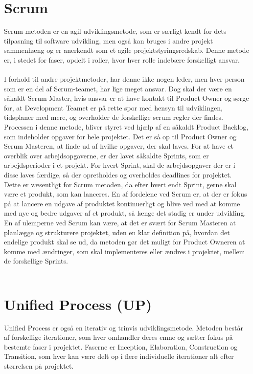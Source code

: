 \section{Scrum}
Scrum-metoden er en agil udviklingsmetode, som er særligt kendt for dets tilpasning til software udvikling, men også kan bruges i andre projekt sammenhæng og er anerkendt som et agile projektstyringsredskab. Denne metode er, i stedet for faser, opdelt i roller, hvor hver rolle indebære forskelligt ansvar.\cite{ScrumRoles} \\ \\
I forhold til andre projektmetoder, har denne ikke nogen leder, men hver person som er en del af Scrum-teamet, har lige meget ansvar. Dog skal der være en såkaldt Scrum Master, hvis ansvar er at have kontakt til Product Owner og sørge for, at Development Teamet er på rette spor med hensyn til udviklingen, tidsplaner med mere, og overholder de forskellige scrum regler der findes. Processen i denne metode, bliver styret ved hjælp af en såkaldt Product Backlog, som indeholder opgaver for hele projektet. Det er så op til Product Owner og Scrum Masteren, at finde ud af hvilke opgaver, der skal laves. For at have et overblik over arbejdsopgaverne, er der lavet såkaldte Sprints, som er arbejdsperioder i et projekt. For hvert Sprint, skal de arbejdsopgaver der er i disse laves færdige, så der opretholdes og overholdes deadlines for projektet. Dette er væsentligt for Scrum metoden, da efter hvert endt Sprint, gerne skal være et produkt, som kan lanceres. En af fordelene ved Scrum er, at der er fokus på at lancere en udgave af produktet kontinuerligt og blive ved med at komme med nye og bedre udgaver af et produkt, så længe det stadig er under udvikling. En af ulemperne ved Scrum kan være, at det er svært for Scrum Masteren at planlægge og strukturere projektet, uden en klar definition på, hvordan det endelige produkt skal se ud, da metoden gør det muligt for Product Owneren at komme med ændringer, som skal implementeres eller ændres i projektet, mellem de forskellige Sprints.\cite{SCRUM}\\
\\
\section{Unified Process (UP)}
Unified Process er også en iterativ og trinvis udviklingsmetode. Metoden består af forskellige iterationer, som hver omhandler deres emne og sætter fokus på bestemte faser i projektet. Faserne er Inception, Elaboration, Construction og Transition, som hver kan være delt op i flere individuelle iterationer alt efter størrelsen på projektet.\cite{UP}


